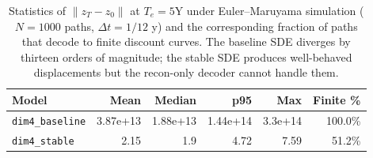 \begin{table}[H]
\centering
\caption{Statistics of $\|z_T - z_0\|$ at $T_e = 5$Y under Euler--Maruyama simulation ($N=1000$ paths, $\Delta t = 1/12$ y) and the corresponding fraction of paths that decode to finite discount curves. The baseline SDE diverges by thirteen orders of magnitude; the stable SDE produces well-behaved displacements but the recon-only decoder cannot handle them.}
\label{tab:displacement_summary}
\small
\begin{tabular}{lrrrrr}
\toprule
Model & Mean & Median & p95 & Max & Finite \% \\
\midrule
\texttt{dim4\_baseline} & 3.87e+13 & 1.88e+13 & 1.44e+14 & 3.3e+14 & 100.0\% \\
\texttt{dim4\_stable} & 2.15 & 1.9 & 4.72 & 7.59 & 51.2\% \\
\bottomrule
\end{tabular}
\end{table}